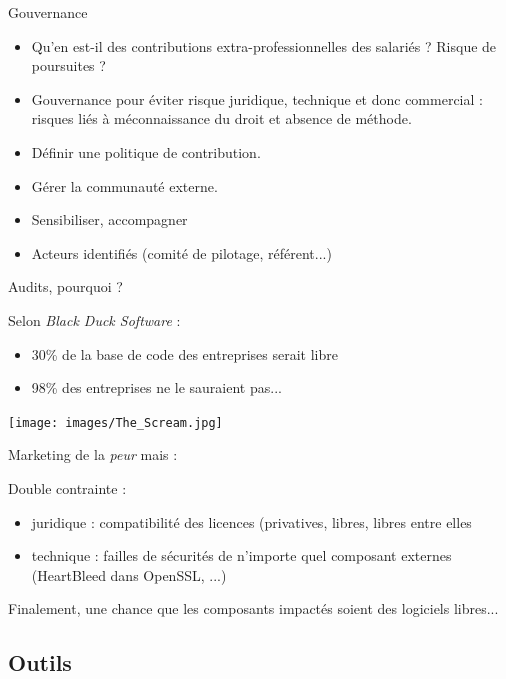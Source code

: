 \documentclass{beamer}
\begin{document}
\begin{frame}{Gouvernance}

  \begin{itemize}
  \item Qu'en est-il des contributions extra-professionnelles des salariés ? Risque de poursuites ?
  \item Gouvernance pour éviter risque juridique, technique et donc commercial : risques liés à méconnaissance du droit et absence de méthode.
  \item Définir une politique de contribution.
  \item Gérer la communauté externe.
  \item Sensibiliser, accompagner
  \item Acteurs identifiés (comité de pilotage, référent...)
  \end{itemize}
  
\end{frame}


\begin{frame}{Audits, pourquoi ?}

Selon \textit{Black Duck Software} :
\begin{itemize}
\item 30\% de la base de code des entreprises serait libre
\item 98\% des entreprises ne le sauraient pas...

\end{itemize}
\begin{minipage}[c]{0.4\linewidth}
\texttt{[image: images/The\_Scream.jpg]}\end{minipage}
\begin{minipage}[c]{0.5\linewidth}
Marketing de la \textit{peur} mais :

Double contrainte :
\begin{itemize}
\item juridique : compatibilité des licences (privatives, libres, libres entre elles
\item technique : failles de sécurités de n'importe quel composant externes (HeartBleed dans OpenSSL, ...)
\end{itemize}
\end{minipage}
Finalement, une chance que les composants impactés soient des logiciels libres...
  
\end{frame}

\subsection{Outils}
\end{document}
